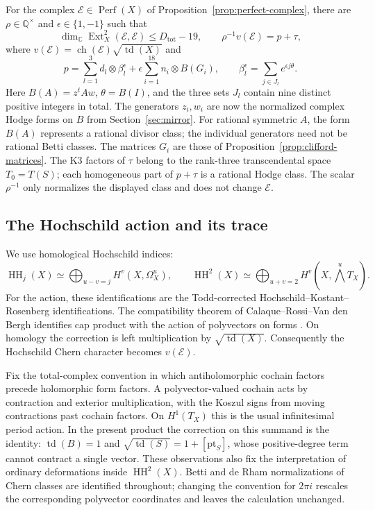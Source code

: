 \documentclass[11pt]{article}
\numberwithin{equation}{section}
\theoremstyle{definition}
\theoremstyle{remark}
\begin{document}
For the complex $\mathcal E\in\operatorname{Perf}(X)$ of
Proposition~\ref{prop:perfect-complex}, there are $\rho\in\mathbb Q^\times$ and
$\epsilon\in\{1,-1\}$ such that
\begin{equation}\label{eq:deformation-input}
 \dim_\mathbb C\operatorname{Ext}^2_X(\mathcal E,\mathcal E)\le D_{\mathrm{tot}}-19,
 \qquad
 \rho^{-1}v(\mathcal E)=p+\tau,
\end{equation}
where $v(\mathcal E)=\operatorname{ch}(\mathcal E)\sqrt{\operatorname{td}(X)}$ and
\begin{equation}\label{eq:deformation-p}
 p=\sum_{l=1}^3d_l\otimes\beta_l^\epsilon
       +\epsilon\sum_{i=1}^{18}n_i\otimes B(G_i),\qquad
 \beta_l^\epsilon=\sum_{j\in J_l}e^{\epsilon j\theta}.
\end{equation}
Here $B(A)=z^tAw$, $\theta=B(I)$, and the three sets $J_l$ contain
nine distinct positive integers in total. The generators $z_i,w_i$
are now the normalized complex Hodge forms on $B$ from
Section~\ref{sec:mirror}. For rational symmetric $A$, the form
$B(A)$ represents a rational divisor class; the individual
generators need not be rational Betti classes. The matrices $G_i$ are those
of Proposition~\ref{prop:clifford-matrices}. The K3 factors of $\tau$
belong to the rank-three transcendental space $T_0=T(S)$; each
homogeneous part of $p+\tau$ is a rational Hodge class. The scalar $\rho^{-1}$
only normalizes the displayed class and does not change $\mathcal E$.

\subsection{The Hochschild action and its trace}

We use homological Hochschild indices:
\[
 \operatorname{HH}_j(X)\simeq\bigoplus_{u-v=j}H^v(X,\Omega_X^u),\qquad
 \operatorname{HH}^2(X)\simeq\bigoplus_{u+v=2}H^v(X,\textstyle\bigwedge^u T_X).
\]
For the action, these identifications are the Todd-corrected
Hochschild--Kostant--Rosenberg identifications. The compatibility
theorem of Calaque--Rossi--Van den Bergh identifies cap product with
the action of polyvectors on forms
\cite[Theorem~1.4]{Deformation:CRV}. On homology the correction is
left multiplication by $\sqrt{\operatorname{td}(X)}$. Consequently the Hochschild
Chern character becomes $v(\mathcal E)$.

Fix the total-complex convention in which antiholomorphic cochain
factors precede holomorphic form factors. A polyvector-valued
cochain acts by contraction and exterior multiplication, with the
Koszul signs from moving contractions past cochain factors. On
$H^1(T_X)$ this is the usual infinitesimal period action. In the
present product the correction on this summand is the identity:
$\operatorname{td}(B)=1$ and
$\sqrt{\operatorname{td}(S)}=1+[\mathrm{pt}_S]$, whose positive-degree term cannot
contract a single vector. These observations also fix the interpretation
of ordinary deformations inside $\operatorname{HH}^2(X)$. Betti and de Rham
normalizations of Chern classes are identified throughout; changing
the convention for $2\pi i$ rescales the corresponding polyvector
coordinates and leaves the calculation unchanged.
\end{document}
